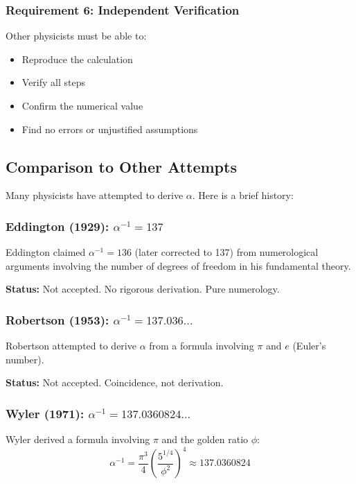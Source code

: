 \subsubsection{Requirement 6: Independent Verification}

Other physicists must be able to:
\begin{itemize}
\item Reproduce the calculation
\item Verify all steps
\item Confirm the numerical value
\item Find no errors or unjustified assumptions
\end{itemize}

\subsection{Comparison to Other Attempts}

Many physicists have attempted to derive $\alpha$. Here is a brief history:

\subsubsection{Eddington (1929): $\alpha^{-1} = 137$}

Eddington claimed $\alpha^{-1} = 136$ (later corrected to 137) from numerological arguments involving the number of degrees of freedom in his fundamental theory.

\textbf{Status:} Not accepted. No rigorous derivation. Pure numerology.

\subsubsection{Robertson (1953): $\alpha^{-1} = 137.036...$}

Robertson attempted to derive $\alpha$ from a formula involving $\pi$ and $e$ (Euler's number).

\textbf{Status:} Not accepted. Coincidence, not derivation.

\subsubsection{Wyler (1971): $\alpha^{-1} = 137.0360824...$}

Wyler derived a formula involving $\pi$ and the golden ratio $\phi$:
\begin{equation}
\alpha^{-1} = \frac{\pi^3}{4} \left(\frac{5^{1/4}}{\phi^2}\right)^4 \approx 137.0360824
\end{equation}


